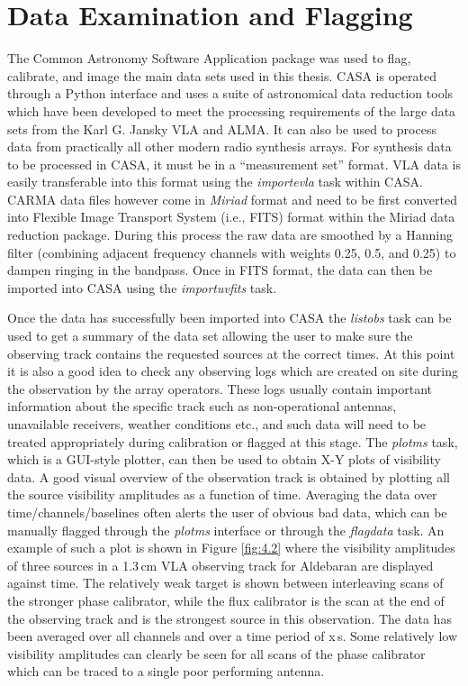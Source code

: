 \section{Data Examination and Flagging}\label{sec:4.1}
The Common Astronomy Software Application \citep[CASA;][]{mcmullin_2007} package was used to flag, calibrate, and image the main data sets used in this thesis. CASA is operated through a Python interface and uses a suite of astronomical data reduction tools which have been developed to meet the processing requirements of the large  data sets from the Karl G. Jansky VLA and ALMA. It can also be used to process data from practically all other modern radio synthesis arrays. For synthesis data to be processed in CASA, it must be in a ``measurement set'' format. VLA data is easily transferable into this format using the \textit{importevla} task within CASA. CARMA data files however come in \textit{Miriad} format and need to be first converted into Flexible Image Transport System (i.e., FITS) format within the Miriad \citep{sault_1995} data reduction package. During this process the raw data are smoothed by a Hanning filter (combining adjacent frequency channels with weights 0.25, 0.5, and 0.25) to dampen ringing in the bandpass. Once in FITS format, the data can then be imported into CASA using the \textit{importuvfits} task.

Once the data has successfully been imported into CASA the \textit{listobs} task can be used to get a summary of the data set allowing the user to make sure the observing track contains the requested sources at the correct times. At this point it is also a good idea to check any observing logs which are created on site during the observation by the array operators. These logs usually contain important information about the specific track such as non-operational antennas, unavailable receivers, weather conditions etc., and such data will need to be treated appropriately during calibration or flagged at this stage. The \textit{plotms} task, which is a GUI-style plotter, can then be used to obtain X-Y plots of visibility data. A good visual overview of the observation track is obtained by plotting all the source visibility amplitudes as a function of time. Averaging the data over time/channels/baselines often alerts the user of obvious bad data, which can be manually flagged through the \textit{plotms} interface or through the \textit{flagdata} task. An example of such a plot is shown in Figure \ref{fig:4.2} where the visibility amplitudes of three sources in a 1.3\,cm VLA observing track for Aldebaran are displayed against time. The relatively weak target is shown between interleaving scans of the stronger phase calibrator, while the flux calibrator is the scan at the end of the observing track and is the strongest source in this observation. The data has been averaged over all channels and over a time period of x\,s. Some relatively low visibility amplitudes can clearly be seen for all scans of the phase calibrator which can be traced to a single poor performing antenna.

